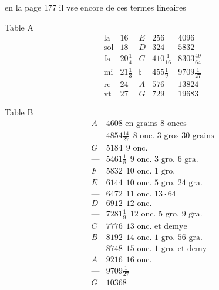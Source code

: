 \documentclass[11pt,a4paper]{article}
\begin{document}
  en la page 177 il vse encore de ces termes lineaires

Table A
\[
\begin{array}{c|c|c|c|c}
\text{la} & 16 & E & 256 & 4096 \\
\text{sol} & 18 & D & 324 & 5832 \\
\text{fa} & 20\frac{1}{4} & C & 410\frac{1}{16} & 8303\frac{49}{64} \\
\text{mi} & 21\frac{1}{3} & \natural & 455\frac{1}{9} & 9709\frac{1}{27} \\
\text{re} & 24 & A & 576 & 13824 \\
\text{vt} & 27 & G & 729 & 19683
\end{array}
\]

Table B
\[
\begin{array}{c|l}
A & 4608 \text{ en grains } 8 \text{ onces} \\
\text{—} & 4854\frac{14}{27}\ \ 8 \text{ onc. } 3 \text{ gros } 30 \text{ grains} \\
G & 5184\ \ 9 \text{ onc.} \\
\text{—} & 5461\frac{1}{8}\ \ 9 \text{ onc. } 3 \text{ gro. } 6 \text{ gra.} \\
F & 5832\ \ 10 \text{ onc. } 1 \text{ gro.} \\
E & 6144\ \ 10 \text{ onc. } 5 \text{ gro. } 24 \text{ gra.} \\
\text{—} & 6472\ \ 11 \text{ onc. } 13\cdot 64 \\
D & 6912\ \ 12 \text{ onc.} \\
\text{—} & 7281\frac{1}{9}\ \ 12 \text{ onc. } 5 \text{ gro. } 9 \text{ gra.} \\
C & 7776\ \ 13 \text{ onc. et demye} \\
B & 8192\ \ 14 \text{ onc. } 1 \text{ gro. } 56 \text{ gra.} \\
\text{—} & 8748\ \ 15 \text{ onc. } 1 \text{ gro. et demy} \\
A & 9216\ \ 16 \text{ onc.} \\
\text{—} & 9709\frac{1}{27} \\
G & 10368
\end{array}
\]
\end{document}
